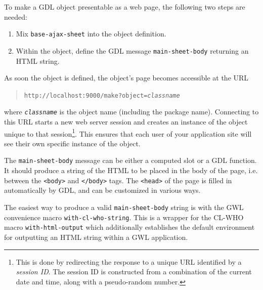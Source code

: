 \documentclass [11pt]{book}
\begin{document}
To make a GDL object presentable as a web page, the following two
steps are needed:

\begin{enumerate}

\item Mix \texttt{base-ajax-sheet} into the object definition.

\item Within the object, define the GDL message \texttt{main-sheet-body} returning an HTML string.

\end{enumerate}





As soon the object is defined, the object's page becomes accessible at the URL

\begin{quote}
\texttt{http://localhost:9000/make?object=\emph{classname}}

\end{quote}
where \texttt{\emph{classname}} is the object name (including the package name).  Connecting to this
URL starts a new web server session and creates an instance of the object unique to that session\footnote{This is done by redirecting the response to a unique URL identified by a \emph{session ID}.
The session ID is constructed from a combination of the current date and time, along with a pseudo-random number.}.
This ensures that each user of your application site will see their own specific instance of the object.



The \texttt{main-sheet-body} message can be either a computed slot or a GDL function.  It should
produce a string of the HTML to be placed in the body of the page, i.e. between the \texttt{<body>} and
\texttt{</body>} tags.  The \texttt{<head>} of the page is filled in automatically by GDL, and can be
customized in various ways.



The easiest way to produce a valid \texttt{main-sheet-body} string is with the GWL convenience macro
\texttt{with-cl-who-string}.  This is a wrapper for the CL-WHO macro \texttt{with-html-output} which
additionally establishes the default environment for outputting an HTML string within a GWL application.
\end{document}
